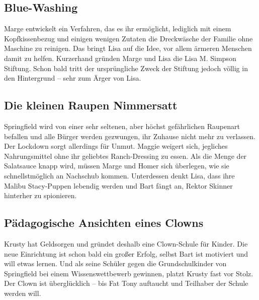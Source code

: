 \subsection{Blue-Washing}
Marge entwickelt ein Verfahren, das es ihr ermöglicht, lediglich mit einem Kopfkissenbezug und einigen wenigen Zutaten die Dreckwäsche der Familie ohne Maschine zu reinigen. Das bringt Lisa auf die Idee, vor allem ärmeren Menschen damit zu helfen. Kurzerhand gründen Marge und Lisa die Lisa M. Simpson Stiftung. Schon bald tritt der ursprüngliche Zweck der Stiftung jedoch völlig in den Hintergrund -- sehr zum Ärger von Lisa.


\subsection{Die kleinen Raupen Nimmersatt}\label{OABF14}
Springfield wird von einer sehr seltenen, aber höchst gefährlichen Raupenart befallen und alle Bürger werden gezwungen, ihr Zuhause nicht mehr zu verlassen. Der Lockdown sorgt allerdings für Unmut. Maggie weigert sich, jegliches Nahrungsmittel ohne ihr geliebtes Ranch-Dressing zu essen. Als die Menge der Salatsauce knapp wird, müssen Marge und Homer sich überlegen, wie sie schnellstmöglich an Nachschub kommen. Unterdessen denkt Lisa, dass ihre Malibu Stacy-Puppen lebendig werden und Bart fängt an, Rektor Skinner hinterher zu spionieren.


\subsection{Pädagogische Ansichten eines Clowns}\label{OABF15}
Krusty hat Geldsorgen und gründet deshalb eine Clown-Schule für Kinder. Die neue Einrichtung ist schon bald ein großer Erfolg, selbst Bart ist motiviert und will etwas lernen. Und als seine Schüler gegen die Grundschulkinder von Springfield bei einem Wissenswettbewerb gewinnen, platzt Krusty fast vor Stolz. Der Clown ist überglücklich -- bis Fat Tony auftaucht und Teilhaber der Schule werden will.

